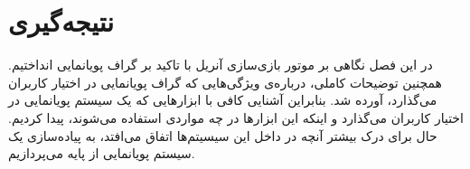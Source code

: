 \section{نتیجه‌گیری}

در این فصل نگاهی بر موتور بازی‌سازی آنریل با تاکید بر گراف پویانمایی انداختیم.
همچنین توضیحات کاملی، درباره‌ی ویژگی‌هایی که گراف پویانمایی در اختیار کاربران می‌گذارد، آورده شد.
بنابراین آشنایی کافی با ابزار‌هایی که یک سیستم پویانمایی در اختیار کاربران می‌گذارد و 
اینکه این ابزارها در چه مواردی استفاده می‌شوند، پیدا کردیم.
حال برای درک بیشتر آنچه در داخل این سیسیتم‌ها اتفاق می‌افتد، به پیاده‌سازی یک سیستم پویانمایی از پایه می‌پردازیم.



